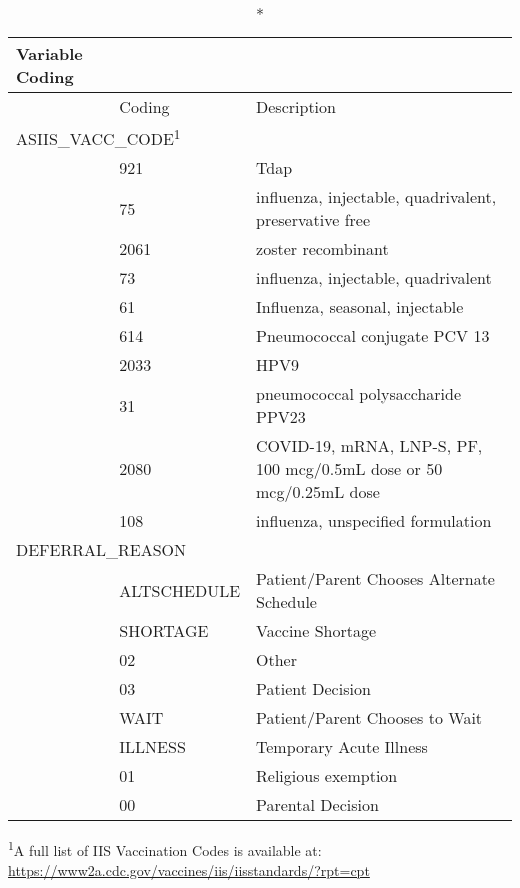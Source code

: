 \documentclass[
  letterpaper,
  DIV=11,
  numbers=noendperiod]{scrreprt}
\begin{document}
\setlength{\LTpost}{0mm}
\begin{longtable}{l|ll}
\caption*{
{\large Variable Coding}
} \\ 
\toprule
\multicolumn{1}{l}{} & Coding & Description \\ 
\midrule
\multicolumn{3}{l}{ASIIS\_VACC\_CODE\textsuperscript{1}} \\ 
\midrule
  & 921 & Tdap \\ 
  & 75 & influenza, injectable, quadrivalent, preservative free \\ 
  & 2061 & zoster recombinant \\ 
  & 73 & influenza, injectable, quadrivalent \\ 
  & 61 & Influenza, seasonal, injectable \\ 
  & 614 & Pneumococcal conjugate PCV 13 \\ 
  & 2033 & HPV9 \\ 
  & 31 & pneumococcal polysaccharide PPV23 \\ 
  & 2080 & COVID-19, mRNA, LNP-S, PF, 100 mcg/0.5mL dose or 50 mcg/0.25mL dose \\ 
  & 108 & influenza, unspecified formulation \\ 
\midrule
\multicolumn{3}{l}{DEFERRAL\_REASON} \\ 
\midrule
  & ALTSCHEDULE & Patient/Parent Chooses Alternate Schedule \\ 
  & SHORTAGE & Vaccine Shortage \\ 
  & 02 & Other \\ 
  & 03 & Patient Decision \\ 
  & WAIT & Patient/Parent Chooses to Wait \\ 
  & ILLNESS & Temporary Acute Illness \\ 
  & 01 & Religious exemption \\ 
  & 00 & Parental Decision \\ 
\bottomrule
\end{longtable}
\begin{minipage}{\linewidth}
\textsuperscript{1}A full list of IIS Vaccination Codes is available at: \href{https://stateofwa.sharepoint.com/:x:/r/sites/DOH-oiinformatics/Shared\%20Documents/CEDAR/CEDAR\%20Data\%20Dictionaries/ASIIS_Vacc_Code\%20Values\%20Table\%20with\%20CDC\%20and\%20CPT\%20Codes.xlsx?d=w58a7246c67aa491fbfef19172d5ca393\&csf=1\&web=1\&e=rIrViQ}{https://www2a.cdc.gov/vaccines/iis/iisstandards/?rpt=cpt}\\
\end{minipage}
\end{document}
